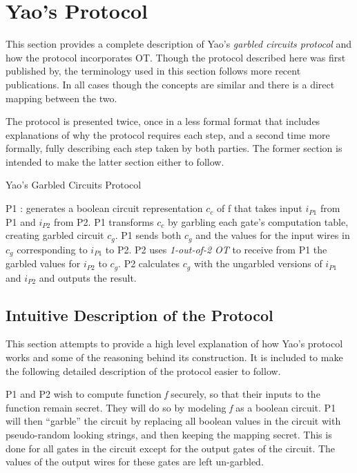 \section{Yao's Protocol}
\label{sec:protocol}

This section provides a complete description of Yao's \emph{garbled circuits protocol} and how the protocol incorporates \ac{OT}.  Though the protocol described here was first published by\cite{goldreich1987play}, the terminology used in this section follows more recent publications\cite{hazay2010efficient}. In all cases though the concepts are similar and there is a direct mapping between the two.

The protocol is presented twice, once in a less formal format that includes explanations of why the protocol requires each step, and a second time more formally, fully describing each step taken by both parties. The former section is intended to make the latter section either to follow.

\begin{algorithm}[H]
    \caption{Yao's Garbled Circuits Protocol}
    \label{alg:yao}
    \begin{algorithmic}[1]
        \STATE \ac{P1} : generates a boolean circuit representation $c_c$ of \ac{f} that takes input $i_{P1}$ from \ac{P1} and $i_{P2}$ from \ac{P2}.
        \STATE \ac{P1} transforms $c_c$ by garbling each gate's computation table, creating garbled circuit $c_g$.
        \STATE \ac{P1} sends both $c_g$ and the values for the input wires in $c_g$ corresponding to $i_{P1}$ to \ac{P2}.
        \STATE \ac{P2} uses \emph{1-out-of-2 \ac{OT}} to receive from \ac{P1} the garbled values for $i_{P2}$ to $c_g$.
        \STATE \ac{P2} calculates $c_g$ with the ungarbled versions of $i_{P1}$ and $i_{P2}$ and outputs the result.
    \end{algorithmic}
\end{algorithm}

\subsection{Intuitive Description of the Protocol}

This section attempts to provide a high level explanation of how Yao's protocol works and some of the reasoning behind its construction. It is included to make the following detailed description of the protocol easier to follow.

\ac{P1} and \ac{P2} wish to compute function \emph{f} securely, so that their inputs to the function remain secret. They will do so by modeling \emph{f} as a boolean circuit. \ac{P1} will then ``garble'' the circuit by replacing all boolean values in the circuit with pseudo-random looking strings, and then keeping the mapping secret. This is done for all gates in the circuit except for the output gates of the circuit.  The values of the output wires for these gates are left un-garbled.


